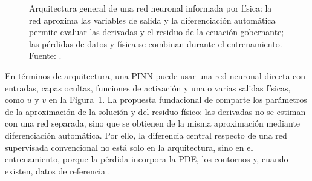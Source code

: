 \begin{figure}[H]
{%
}
\caption[Arquitectura general de una red neuronal informada por física]{Arquitectura general de una red neuronal informada por física: la red aproxima las variables de salida y la diferenciación automática permite evaluar las derivadas y el residuo de la ecuación gobernante; las pérdidas de datos y física se combinan durante el entrenamiento. Fuente: \textcite[fig.~1]{lawal2022}.}
\label{fig:arquitectura-pinn-lawal}
\end{figure}

En términos de arquitectura, una PINN puede usar una red neuronal directa con entradas, capas ocultas, funciones de activación y una o varias salidas físicas, como $u$ y $v$ en la Figura~\ref{fig:arquitectura-pinn-lawal}. La propuesta fundacional de \textcite[686--690]{raissi2019} comparte los parámetros de la aproximación de la solución y del residuo físico: las derivadas no se estiman con una red separada, sino que se obtienen de la misma aproximación mediante diferenciación automática. Por ello, la diferencia central respecto de una red supervisada convencional no está solo en la arquitectura, sino en el entrenamiento, porque la pérdida incorpora la PDE, los contornos y, cuando existen, datos de referencia \parencites[686--690]{raissi2019}[1--2,14--17]{lawal2022}.

